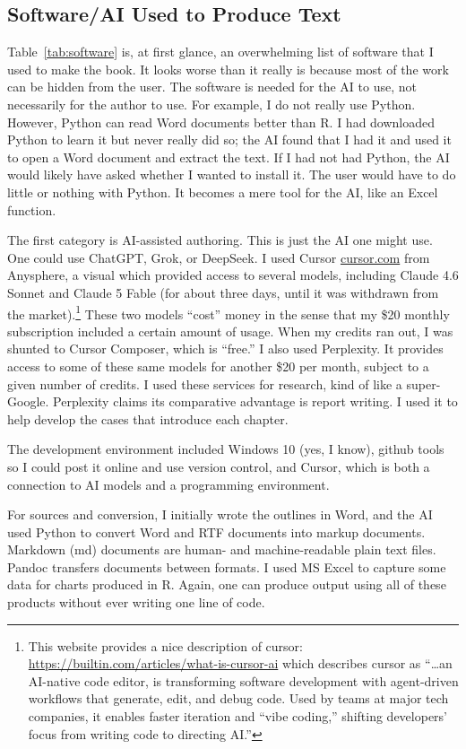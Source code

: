 \documentclass[11pt,letterpaper]{article}
\begin{document}
\subsection{Software/AI Used to Produce Text}

Table~\ref{tab:software} is, at first glance, an overwhelming list of software that I used to make the book. It looks worse than it really is because most of the work can be hidden from the user. The software is needed for the AI to use, not necessarily for the author to use. For example, I do not really use Python. However, Python can read Word documents better than R. I had downloaded Python to learn it but never really did so; the AI found that I had it and used it to open a Word document and extract the text. If I had not had Python, the AI would likely have asked whether I wanted to install it. The user would have to do little or nothing with Python. It becomes a mere tool for the AI, like an Excel function.

The first category is AI-assisted authoring. This is just the AI one might use. One could use ChatGPT, Grok, or DeepSeek. I used Cursor \url{cursor.com} from Anysphere, a visual which provided access to several models, including Claude 4.6 Sonnet and Claude 5 Fable (for about three days, until it was withdrawn from the market).\footnote{This website provides a nice description of cursor: \url{https://builtin.com/articles/what-is-cursor-ai} which describes cursor as ``\ldots an AI-native code editor, is transforming software development with agent-driven workflows that generate, edit, and debug code. Used by teams at major tech companies, it enables faster iteration and “vibe coding,” shifting developers’ focus from writing code to directing AI.''} These two models ``cost'' money in the sense that my \$20 monthly subscription included a certain amount of usage. When my credits ran out, I was shunted to Cursor Composer, which is ``free.'' I also used Perplexity. It provides access to some of these same models for another \$20 per month, subject to a given number of credits. I used these services for research, kind of like a super-Google. Perplexity claims its comparative advantage is report writing. I used it to help develop the cases that introduce each chapter.

The development environment included Windows 10 (yes, I know), github tools so I could post it online and use version control, and Cursor, which is both a connection to AI models and a programming environment. 

For sources and conversion, I initially wrote the outlines in Word, and the AI used Python to convert Word and RTF documents into markup documents. Markdown (md) documents are human- and machine-readable plain text files. Pandoc transfers documents between formats. I used MS Excel to capture some data for charts produced in R. Again, one can produce output using all of these products without ever writing one line of code.
\end{document}
